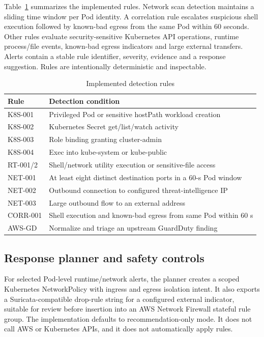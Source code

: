 \documentclass[conference]{IEEEtran}
\begin{document}
Table~\ref{tab:rules} summarizes the implemented rules. Network scan detection maintains a sliding time window per Pod identity. A correlation rule escalates suspicious shell execution followed by known-bad egress from the same Pod within 60 seconds. Other rules evaluate security-sensitive Kubernetes API operations, runtime process/file events, known-bad egress indicators and large external transfers. Alerts contain a stable rule identifier, severity, evidence and a response suggestion. Rules are intentionally deterministic and inspectable.

\begin{table}[t]
\caption{Implemented detection rules}\label{tab:rules}
\centering\small
\begin{tabular}{p{}p{}}
\toprule
Rule & Detection condition \\
\midrule
K8S-001 & Privileged Pod or sensitive hostPath workload creation \\
K8S-002 & Kubernetes Secret get/list/watch activity \\
K8S-003 & Role binding granting cluster-admin \\
K8S-004 & Exec into kube-system or kube-public \\
RT-001/2 & Shell/network utility execution or sensitive-file access \\
NET-001 & At least eight distinct destination ports in a 60-s Pod window \\
NET-002 & Outbound connection to configured threat-intelligence IP \\
NET-003 & Large outbound flow to an external address \\
CORR-001 & Shell execution and known-bad egress from same Pod within 60 s \\
AWS-GD & Normalize and triage an upstream GuardDuty finding \\
\bottomrule
\end{tabular}
\end{table}

\subsection{Response planner and safety controls}
For selected Pod-level runtime/network alerts, the planner creates a scoped Kubernetes NetworkPolicy with ingress and egress isolation intent. It also exports a Suricata-compatible drop-rule string for a configured external indicator, suitable for review before insertion into an AWS Network Firewall stateful rule group. The implementation defaults to recommendation-only mode. It does not call AWS or Kubernetes APIs, and it does not automatically apply rules.
\end{document}
